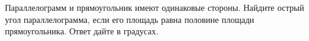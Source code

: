 \begin{ex}
	\begin{condition}
		Параллелограмм и прямоугольник имеют одинаковые стороны. Найдите острый угол параллелограмма, если его площадь равна половине площади прямоугольника. Ответ дайте в градусах.
	\end{condition}
\end{ex}